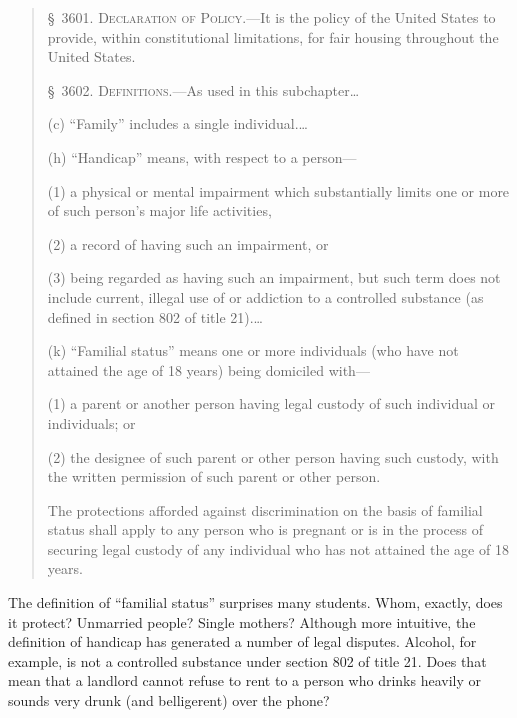 \begin{quotation}
\S~3601.  \textsc{Declaration of Policy}.---It is the policy of the United
States to provide, within constitutional limitations, for fair housing
throughout the United States.

\S~3602.  \textsc{Definitions}.---As used in this subchapter\ldots
\begin{statute}
\item (c) ``Family'' includes a single individual.\ldots

\item (h) ``Handicap'' means, with respect to a person---

\begin{statute}
\item (1) a physical or mental impairment which substantially limits one or
more of such person's major life activities,

\item (2) a record of having such an impairment, or

\item (3) being regarded as having such an impairment, but such term does not
include current, illegal use of or addiction to a controlled substance (as
defined in section 802 of title 21).\ldots
\end{statute}
\item (k) ``Familial status'' means one or more individuals (who
have not attained the age of 18 years) being domiciled with---
\begin{statute}
\item (1) a parent or another person having legal custody of such individual or
individuals; or  

\item (2) the designee of such parent or other person having such custody, with
the written permission of such parent or other person. 
\end{statute}
The protections afforded against discrimination on the basis of familial status
shall apply to any person who is pregnant or is in the process of securing
legal custody of any individual who has not attained the age of 18 years.
\end{statute}
\end{quotation}

The definition of ``familial status'' surprises many students. Whom, exactly,
does it protect? Unmarried people? Single mothers? Although more intuitive, the
definition of handicap has generated a number of legal disputes.  Alcohol, for
example, is not a controlled substance under section 802 of title 21. Does that
mean that a landlord cannot refuse to rent to a person who drinks heavily or
sounds very drunk (and belligerent) over the phone?  

